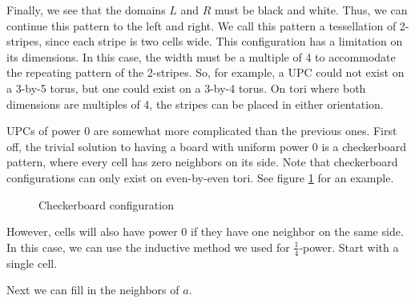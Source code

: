 \documentclass[12pt]{article}
\theoremstyle{definition}
\theoremstyle{remark}
\theoremstyle{remark}
\begin{document}
Finally, we see that the domains $L$ and $R$ must be black and white. Thus, we can continue this pattern to the left and right.
We call this pattern a tessellation of 2-stripes, since each stripe is two cells wide. This configuration has a limitation on its dimensions. In this case, the width must be a multiple of 4 to accommodate the repeating pattern of the 2-stripes. So, for example, a UPC could not exist on a 3-by-5 torus, but one could exist on a 3-by-4 torus. On tori where both dimensions are multiples of 4, the stripes can be placed in either orientation.

\par
UPCs of power $0$ are somewhat more complicated than the previous ones. First off, the trivial solution to having a board with uniform power $0$ is a checkerboard pattern, where every cell has zero neighbors on its side. Note that checkerboard configurations can only exist on even-by-even tori. See figure \ref{Checkerboard} for an example. 
\begin{figure}
  \centering
  \caption{Checkerboard configuration}
  \label{Checkerboard}
\end{figure}
\par
However, cells will also have power $0$ if they have one neighbor on the same side. In this case, we can use the inductive method we used for $\frac{1}{4}$-power. Start with a single cell.
\begin{figure}[H]
\end{figure}
Next we can fill in the neighbors of $a$.
\begin{figure}[H]
\end{figure}
\end{document}
